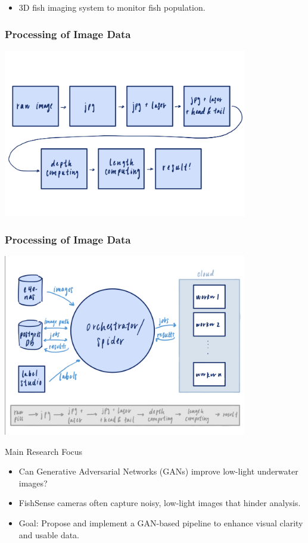 \begin{frame}
    \begin{itemize}
        \item 3D fish imaging system to monitor fish population.
    \end{itemize}
    
    
\end{frame}

\begin{frame}
    \frametitle{Processing of Image Data}

    \centering
    \includegraphics[width=0.8\textwidth, keepaspectratio]{images/flow1.png}
\end{frame}

\begin{frame}
    \frametitle{Processing of Image Data}

    \centering
    \includegraphics[width=0.8\textwidth, keepaspectratio]{images/flow2.png}
\end{frame}

\begin{frame}{Main Research Focus}
    \begin{itemize}
        \item Can Generative Adversarial Networks (GANs) improve low-light underwater images?
        \item  FishSense cameras often capture noisy, low-light images that hinder analysis.
        \item Goal: Propose and implement a GAN-based pipeline to enhance visual clarity and usable data.
    \end{itemize}
\end{frame}

